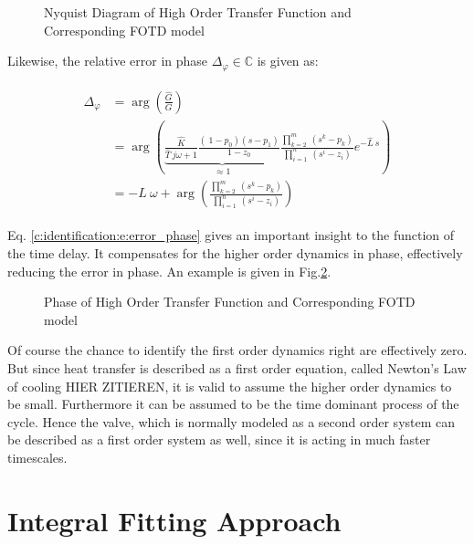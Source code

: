 \begin{figure}[H]
  \centering
  \def\svgwidth{\textwidth}
  
  \caption{Nyquist Diagram of High Order Transfer Function and Corresponding FOTD model}
  \label{c:identification:f:nyquist_fotd}
\end{figure}


Likewise, the relative error in phase $\Delta_\varphi \in \mathbb{C}$ is given as:

\begin{align}
\begin{split}
\Delta_\varphi &= \arg\left(\frac{\hat{G}}{G}\right) \\
&= \arg\left(\underbrace{\frac{\hat{K}}{\hat{T}~j\omega+1} \frac{\left(\ 1-p_0 \right)\left( s- p_1 \right)}{1-z_0}}_{\approx 1} \frac{\prod_{k=2}^m~(s^k-p_k)}{\prod_{i=1}^n~(s^i-z_i)}e^{-\hat{L}~s} \right)\\
&= -L~\omega + \arg\left(\frac{\prod_{k=2}^m~(s^k-p_k)}{\prod_{i=1}^n~(s^i-z_i)}\right)
\end{split}
\label{c:identification:e:error_phase}
\end{align}

Eq. \ref{c:identification:e:error_phase} gives an important insight to the function of the time delay. It compensates for the higher order dynamics in phase, effectively reducing the error in phase. An example is given in Fig.\ref{c:identification:f:phase_fotd}.\\

\begin{figure}[h!]
  \centering
  \def\svgwidth{\textwidth}
  
  \caption{Phase of High Order Transfer Function and Corresponding FOTD model}
  \label{c:identification:f:phase_fotd}
\end{figure}


Of course the chance to identify the first order dynamics right are effectively zero. But since heat transfer is described as a first order equation, called Newton's Law of cooling HIER ZITIEREN, it is valid to assume the higher order dynamics to be small. Furthermore it can be assumed to be the time dominant process of the cycle. Hence the valve, which is normally modeled as a second order system can be described as a first order system as well, since it is acting in much faster timescales.\\


\section{Integral Fitting Approach}
\label{c:identification:s:area}

